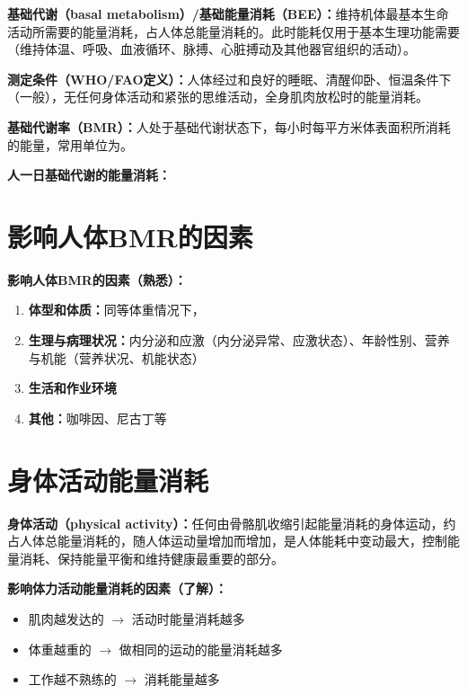\begin{keybox}
\textbf{基础代谢（basal metabolism）/基础能量消耗（BEE）：}维持机体最基本生命活动所需要的能量消耗，占人体总能量消耗的。此时能耗仅用于基本生理功能需要（维持体温、呼吸、血液循环、脉搏、心脏搏动及其他器官组织的活动）。

\textbf{测定条件（WHO/FAO定义）：}人体经过和良好的睡眠、清醒仰卧、恒温条件下（一般），无任何身体活动和紧张的思维活动，全身肌肉放松时的能量消耗。

\textbf{基础代谢率（BMR）：}人处于基础代谢状态下，每小时每平方米体表面积所消耗的能量，常用单位为。

\textbf{人一日基础代谢的能量消耗：}
\end{keybox}

\section{影响人体BMR的因素}

\begin{tipbox}
\textbf{影响人体BMR的因素（熟悉）：}
\begin{enumerate}[leftmargin=*]
    \item \textbf{体型和体质：}同等体重情况下，
    \item \textbf{生理与病理状况：}内分泌和应激（内分泌异常、应激状态）、年龄性别、营养与机能（营养状况、机能状态）
    \item \textbf{生活和作业环境}
    \item \textbf{其他：}咖啡因、尼古丁等
\end{enumerate}
\end{tipbox}

\section{身体活动能量消耗}

\begin{defbox}
\textbf{身体活动（physical activity）：}任何由骨骼肌收缩引起能量消耗的身体运动，约占人体总能量消耗的，随人体运动量增加而增加，是人体能耗中变动最大，控制能量消耗、保持能量平衡和维持健康最重要的部分。
\end{defbox}

\begin{tipbox}
\textbf{影响体力活动能量消耗的因素（了解）：}
\begin{itemize}[leftmargin=*]
    \item 肌肉越发达的 $\rightarrow$ 活动时能量消耗越多
    \item 体重越重的 $\rightarrow$ 做相同的运动的能量消耗越多
    \item 工作越不熟练的 $\rightarrow$ 消耗能量越多
\end{itemize}
\end{tipbox}

